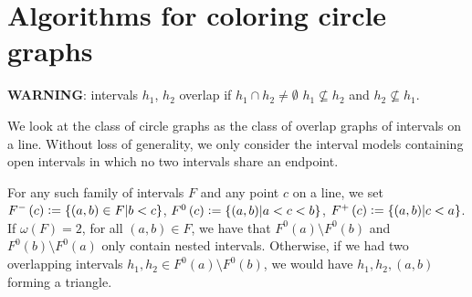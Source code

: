 \documentclass{article}
\theoremstyle{definition}
\newcommand{\defeq}{\vcentcolon=}
\begin{document}
    \section{Algorithms for coloring circle graphs}
    
    \textbf{WARNING}: intervals
    $h_1$, $h_2$ overlap if
    $h_1 \cap h_2 \neq \emptyset$
    $h_1 \not \subseteq h_2$ and
    $h_2 \not \subseteq h_1$.
    \vspace{4pt}

    We look at the class
    of circle graphs as the class
    of overlap graphs of intervals on a line.
    Without loss of generality,
    we only consider the interval
    models containing open intervals
    in which no two intervals
    share an endpoint.

    For any such family of intervals
    $F$ and any point $c$ on a line,
    we set $F^{-}\left(c\right) \defeq
    \left\{\left(a, b\right) \in F
    \middle| b < c\right\}$,
    $F^{0}\left(c\right) \defeq
    \left\{\left(a, b\right)
    \middle| a < c < b\right\}$,
    $F^{+}\left(c\right) \defeq
    \left\{\left(a, b\right)
    \middle| c < a\right\}$.
    If $\omega\left(F\right) = 2$,
    for all $\left(a, b\right) \in F$,
    we have that
    $F^{0}\left(a\right) \setminus F^{0}\left(b\right)$ 
    and $F^{0}\left(b\right) \setminus F^{0}\left(a\right)$
    only contain nested intervals.
    Otherwise, if we had two
    overlapping intervals $h_1, h_2 \in
    F^{0}\left(a\right) \setminus F^{0}\left(b\right)$,
    we would have $h_1, h_2, \left(a, b\right)$ 
    forming a triangle.
\end{document}

